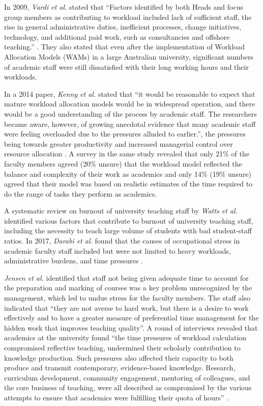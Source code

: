 In 2009, \textit{Vardi et al.} stated that ``Factors identified by both Heads and focus group members as contributing to workload included lack of sufficient staff, the rise in general administrative duties, inefficient processes, change initiatives, technology, and additional paid work, such as consultancies and offshore teaching.'' \cite{vardi2009impacts}. They also stated that even after the implementation of Workload Allocation Models (WAMs) in a large Australian university, significant numbers of academic staff were still dissatisfied with their long working hours and their workloads.

In a 2014 paper, \textit{Kenny et al.} stated that ``it would be reasonable to expect that mature workload allocation models would be in widespread operation, and there would be a good understanding of the process by academic staff. The researchers became aware, however, of growing anecdotal evidence that many academic staff were feeling overloaded due to the pressures alluded to earlier.'', the pressures being towards greater productivity and increased managerial control over resource allocation \cite{kenny2014effectiveness}. A survey in the same study revealed that only 21\% of the faculty members agreed (20\% unsure) that the workload model reflected the balance and complexity of their work as academics and only 14\% (19\% unsure) agreed that their model was based on realistic estimates of the time required to do the range of tasks they perform as academics.

A systematic review on burnout of university teaching staff by \textit{Watts et al.} \cite{watts2011burnout} identified various factors that contribute to burnout of university teaching staff, including the necessity to teach large volume of students with bad student-staff ratios. In 2017, \textit{Darabi et al.} found that the causes of occupational stress in academic faculty staff included but were not limited to heavy workloads, administrative burdens, and time pressures \cite{darabi2017qualitative}.

\textit{Jensen et al.} identified that staff not being given adequate time to account for the preparation and marking of courses was a key problem unrecognized by the management, which led to undue stress for the faculty members. The staff also indicated that ``they are not averse to hard work, but there is a desire to work effectively and to have a greater measure of preferential time management for the hidden work that improves teaching quality''. A round of interviews revealed that academics at the university found ``the time pressures of workload calculation compromised reflective teaching, undermined their scholarly contribution to knowledge production. Such pressures also affected their capacity to both produce and transmit contemporary, evidence-based knowledge. Research, curriculum development, community engagement, mentoring of colleagues, and the core business of teaching, were all described as compromised by the various attempts to ensure that academics were fulfilling their quota of hours'' \cite{jensen2009vanishing}.

